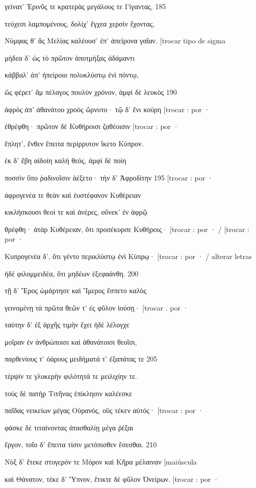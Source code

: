 γείνατ' Ἐρινῦς τε κρατερὰς μεγάλους τε Γίγαντας, 185

τεύχεσι λαμπομένους, δολίχ' ἔγχεα χερσὶν ἔχοντας,

Νύμφας θ' ἃς Μελίας καλέουσ' ἐπ' ἀπείρονα γαῖαν. {[}trocar tipo de sigma

μήδεα δ' ὡς τὸ πρῶτον ἀποτμήξας ἀδάμαντι

κάββαλ' ἀπ' ἠπείροιο πολυκλύστῳ ἐνὶ πόντῳ,

ὣς φέρετ' ἂμ πέλαγος πουλὺν χρόνον, ἀμφὶ δὲ λευκὸς 190

ἀφρὸς ἀπ' ἀθανάτου χροὸς ὤρνυτο· τῷ δ' ἔνι κούρη {[}trocar : por ·

ἐθρέφθη· πρῶτον δὲ Κυθήροισι ζαθέοισιν {[}trocar : por ·

ἔπλητ', ἔνθεν ἔπειτα περίρρυτον ἵκετο Κύπρον.

ἐκ δ' ἔβη αἰδοίη καλὴ θεός, ἀμφὶ δὲ ποίη

ποσσὶν ὕπο ῥαδινοῖσιν ἀέξετο· τὴν δ' Ἀφροδίτην 195 {[}trocar : por ·

ἀφρογενέα τε θεὰν καὶ ἐυστέφανον Κυθέρειαν

κικλήσκουσι θεοί τε καὶ ἀνέρες, οὕνεκ' ἐν ἀφρῷ

θρέφθη· ἀτὰρ Κυθέρειαν, ὅτι προσέκυρσε Κυθήροις· {[}trocar : por · /
{[}trocar : por ·

Κυπρογενέα δ', ὅτι γέντο περικλύστῳ ἐνὶ Κύπρῳ· {[}trocar : por · /
alterar letras

ἠδὲ φιλομμειδέα, ὅτι μηδέων ἐξεφαάνθη. 200

τῇ δ' Ἔρος ὡμάρτησε καὶ Ἵμερος ἔσπετο καλὸς

γεινομένῃ τὰ πρῶτα θεῶν τ' ἐς φῦλον ἰούσῃ· {[}trocar . por ·

ταύτην δ' ἐξ ἀρχῆς τιμὴν ἔχει ἠδὲ λέλογχε

μοῖραν ἐν ἀνθρώποισι καὶ ἀθανάτοισι θεοῖσι,

παρθενίους τ' ὀάρους μειδήματά τ' ἐξαπάτας τε 205

τέρψίν τε γλυκερὴν φιλότητά τε μειλιχίην τε.

τοὺς δὲ πατὴρ Τιτῆνας ἐπίκλησιν καλέεσκε

παῖδας νεικείων μέγας Οὐρανός, οὓς τέκεν αὐτός· {[}trocar : por ·

φάσκε δὲ τιταίνοντας ἀτασθαλίῃ μέγα ῥέξαι

ἔργον, τοῖο δ' ἔπειτα τίσιν μετόπισθεν ἔσεσθαι. 210

Νὺξ δ' ἔτεκε στυγερόν τε Μόρον καὶ Κῆρα μέλαιναν {[}maiúscula

καὶ Θάνατον, τέκε δ' Ὕπνον, ἔτικτε δὲ φῦλον Ὀνείρων. {[}trocar : por ·

